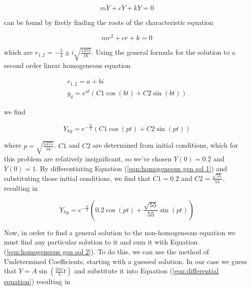 \documentclass[12pt]{article}
\begin{document}
\begin{enumerate}
        \begin{equation}
            m\ddot{Y}+c\dot{Y}+kY=0
            \label{eqn:homogeneous equation}
        \end{equation}

        \noindent
        can be found by firstly finding the roots of the characteristic equation 
        
        \begin{equation}
            mr^2+cr+k=0
            \label{eqn:homogeneous characteristic}
        \end{equation}
        
        which are $r_{1,2}=-\frac{5}{4}\pm i\sqrt{\frac{1375}{16}}$. Using the general formula for 
        the solution to a second order linear homogeneous equation
        
        \begin{equation}
            \begin{gathered}
                r_{1,2} = a+bi \\
                y_g = e^{at}(C1\cos(bt)+C2\sin(bt))
            \end{gathered}
            \label{eqn:gen formula homo soln}
        \end{equation}

        we find 

        \begin{equation}
            Y_{hg} = e^{-\frac{5t}{4}}(C1\cos(pt)+C2\sin(pt))
            \label{eqn:homogeneous gen sol 1}
        \end{equation}

        where $p = \sqrt{\frac{1375}{16}}$. $C1$ and $C2$ are determined from initial conditions, which 
        for this problem are relatively insignificant, so we've chosen $Y(0)=0.2$ and $\dot{Y}(0)=1$. By 
        differentiating Equation (\ref{eqn:homogeneous gen sol 1}) and substituting those initial conditions, 
        we find that $C1=0.2$ and $C2=\frac{\sqrt{55}}{55}$, resulting in
        
        \begin{equation}
            Y_{hg} = e^{-\frac{5t}{4}}(0.2\cos(pt)+\frac{\sqrt{55}}{55}\sin(pt))
            \label{eqn:homogeneous gen sol 2}
        \end{equation}

        Now, in order to find a general solution to the non-homogeneous equation we must find any 
        particular solution to it and sum it with Equation (\ref{eqn:homogeneous gen sol 2}). To do 
        this, we can use the method of Undetermined Coefficients, starting with a guessed solution. 
        In our case we guess that $Y = A\sin(\frac{2\pi v}{\lambda}t)$ and substitute it into Equation 
        (\ref{eqn:differential equation}) resulting in 


\end{enumerate}
\end{document}
